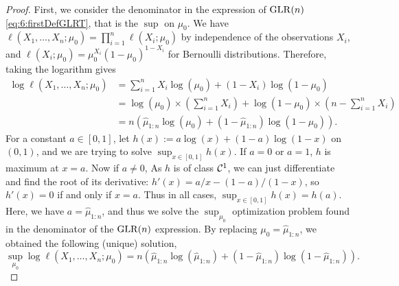 \begin{proof}
    First, we consider the denominator in the expression of $\mathrm{GLR}(n)$ \eqref{eq:6:firstDefGLRT}, that is the $\sup$ on $\mu_0$.
    We have $\ell(X_1, \ldots, X_n ; \mu_0) = \prod_{i=1}^n \ell(X_i ; \mu_0)$ by independence of the observations $X_i$,
    and $\ell(X_i ; \mu_0) = \mu_0^{X_i} (1-\mu_0)^{1-X_i}$ for Bernoulli distributions.
    Therefore, taking the logarithm gives
    \begin{align*}
        \log\ell(X_1, \ldots, X_n ; \mu_0)
        &= \sum_{i=1}^n X_i \log(\mu_0) + (1-X_i) \log(1-\mu_0) \\
        &= \log(\mu_0) \times \left( \sum_{i=1}^n X_i \right) + \log(1-\mu_0) \times \left( n - \sum_{i=1}^n X_i \right) \\
        &= n \left( \widehat{\mu}_{1:n} \log(\mu_0) + (1 - \widehat{\mu}_{1:n}) \log(1-\mu_0) \right).
    \end{align*}
    For a constant $a\in[0,1]$, let $h(x) := a \log(x) + (1-a) \log(1-x)$ on $(0,1)$,
    and we are trying to solve $\sup_{x\in[0,1]} h(x)$.
    If $a=0$ or $a=1$, $h$ is maximum at $x=a$.
    Now if $a\neq0$, As $h$ is of class $\mathcal{C}^1$, we can just differentiate and find the root of its derivative:
    $h'(x) = a/x - (1-a)/(1-x)$, so $h'(x) = 0$ if and only if $x=a$.
    Thus in all cases, $\sup_{x\in[0,1]} h(x) = h(a)$.
    Here, we have $a = \widehat{\mu}_{1:n}$, and thus we solve the $\sup_{\mu_0}$ optimization problem found in the denominator of the $\mathrm{GLR}(n)$ expression.
    By replacing $\mu_0 = \widehat{\mu}_{1:n}$, we obtained the following (unique) solution,
    \begin{equation}\label{eq:6:solutionPbOpt_for_1n}
        \sup_{\mu_0} \log\ell(X_1, \ldots, X_n ; \mu_0) = n \left( \widehat{\mu}_{1:n} \log(\widehat{\mu}_{1:n}) + (1 - \widehat{\mu}_{1:n}) \log(1-\widehat{\mu}_{1:n}) \right).
    \end{equation}


\end{proof}
